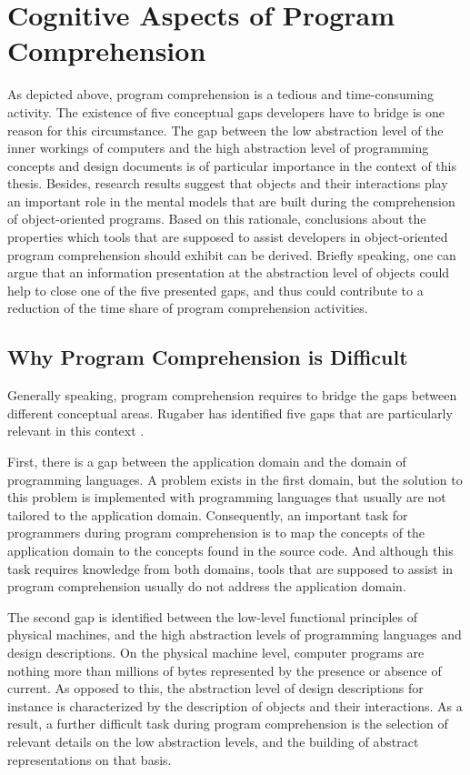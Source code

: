 \section[Cognitive Aspects of Program Comprehension]{Cognitive Aspects of Program Comprehension%
}
\label{s:BackgroundComprehension}
As depicted above, program comprehension is a tedious and time-consuming activity.
The existence of five conceptual gaps developers have to bridge is one reason for this circumstance.
The gap between the low abstraction level of the inner workings of computers and the high abstraction level of programming concepts and design documents is of particular importance in the context of this thesis.
Besides, research results suggest that objects and their interactions play an important role in the mental models that are built during the comprehension of object-oriented programs.
Based on this rationale, conclusions about the properties which tools that are supposed to assist developers in object-oriented program comprehension should exhibit can be derived.
Briefly speaking, one can argue that an information presentation at the abstraction level of objects could help to close one of the five presented gaps, and thus could contribute to a reduction of the time share of program comprehension activities.

\subsection{Why Program Comprehension is Difficult}
\label{ss:BackgroundComprehensionDifficulties}
Generally speaking, program comprehension requires to bridge the gaps between different conceptual areas.
Rugaber has identified five gaps that are particularly relevant in this context \cite{kent_program_1996}.

First, there is a gap between the application domain and the domain of programming languages.
A problem exists in the first domain, but the solution to this problem is implemented with programming languages that usually are not tailored to the application domain.
Consequently, an important task for programmers during program comprehension is to map the concepts of the application domain to the concepts found in the source code.
And although this task requires knowledge from both domains, tools that are supposed to assist in program comprehension usually do not address the application domain.

The second gap is identified between the low-level functional principles of physical machines, and the high abstraction levels of programming languages and design descriptions.
On the physical machine level, computer programs are nothing more than millions of bytes represented by the presence or absence of current.
As opposed to this, the abstraction level of design descriptions for instance is characterized by the description of objects and their interactions.
As a result, a further difficult task during program comprehension is the selection of relevant details on the low abstraction levels, and the building of abstract representations on that basis.

